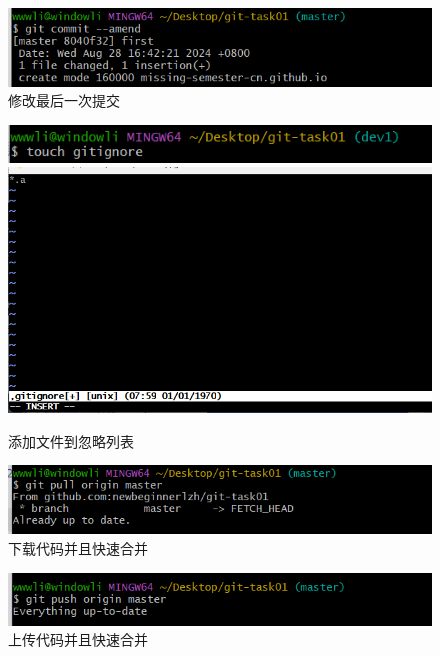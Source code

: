 \documentclass[a4paper, 12pt]{article}
\begin{document}
    \begin{figure}[H]
  \centering
  \includegraphics[width=1\textwidth]{屏幕截图 2024-08-29 100548.png}
  \caption{修改最后一次提交}
    \end{figure}

      \begin{figure}[H]
  \centering
  \includegraphics[width=1\textwidth]{屏幕截图 2024-08-29 103132.png}
  \includegraphics[width=1\textwidth]{屏幕截图 2024-08-29 102427.png}
  \caption{添加文件到忽略列表}
    \end{figure}

    

    \begin{figure}[H]
  \centering
  \includegraphics[width=1\textwidth]{屏幕截图 2024-08-29 114216.png}
  \caption{下载代码并且快速合并}
    \end{figure}

    
    \begin{figure}[H]
  \centering
  \includegraphics[width=1\textwidth]{屏幕截图 2024-08-29 114230.png}
  \caption{上传代码并且快速合并}
    \end{figure}
\end{document}
